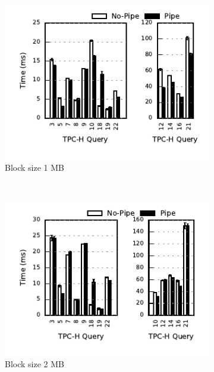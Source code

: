 \begin{figure}
	\centering
	\begin{subfigure}[ht]{0.32\textwidth}
		\includegraphics[width=\textwidth]{pipeline/figures/first-consumer-comparison-1mb-withlip}	
		\caption{Block size 1 MB}
	\end{subfigure}
	~
	\begin{subfigure}[ht]{0.32\textwidth}
		\includegraphics[width=\textwidth]{pipeline/figures/first-consumer-comparison-2mb-withlip}	
		\caption{Block size 2 MB}		
	\end{subfigure}
	~
	\begin{subfigure}[ht]{0.32\textwidth}

\end{subfigure}
\end{figure}
